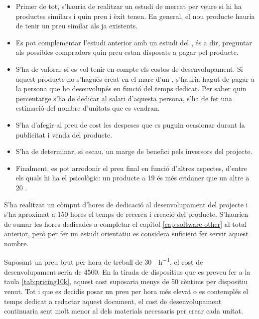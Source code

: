 \begin{itemize}
    \item Primer de tot, s'hauria de realitzar un estudi de mercat per veure
    si hi ha productes similars i quin preu i èxit tenen. En general, el nou
    producte hauria de tenir un preu similar als ja existents.
    \item Es pot complementar l'estudi anterior amb un estudi del ,
    és a dir, preguntar als possibles compradors quin preu estan disposats a
    pagar pel producte.
    \item S'ha de valorar si es vol tenir en compte els costos de
    desenvolupament. Si aquest producte no s'hagués creat en el marc d'un ,
    s'hauria hagut de pagar a la persona que ho desenvolupés en funció del
    temps dedicat. Per saber quin percentatge s'ha de dedicar al salari d'aquesta
    persona, s'ha de fer una estimació del nombre d'unitats que es vendran.
    \item S'ha d'afegir al preu de cost les despeses que es puguin ocasionar
    durant la publicitat i venda del producte.
    \item S'ha de determinar, si escau, un marge de benefici pels inversors
    del projecte.
    \item Finalment, es pot arrodonir el preu final en funció d'altres aspectes,
    d'entre els quals hi ha el psicològic: un producte a
    \SI[round-mode=places,round-precision=0]{19}{\EUR} és més cridaner que un
    altre a \SI[round-mode=places,round-precision=0]{20}{\EUR}
    \cite{kumar2017impact}.
\end{itemize}

S'ha realitzat un còmput d'hores de dedicació al desenvolupament del projecte i
s'ha aproximat a 150 hores el temps de recerca i creació del producte.
S'haurien de sumar les hores dedicades a completar el capítol
\ref{cap:software-other} al total anterior, però per fer un estudi orientatiu
es considera suficient fer servir aquest nombre.

Suposant un preu brut per hora de treball de
\SI[round-mode=places,round-precision=0]{30}{\EUR\per\hour}, el cost de
desenvolupament seria de \SI[round-mode=places,round-precision=0]{4500}{\EUR}.
En la tirada de dispositius que es preveu fer a la taula \ref{tab:pricing10k},
aquest cost suposaria menys de 50 cèntims per dispositiu venut. Tot i que es
decidís posar un preu per hora més elevat o es contemplés el temps dedicat a
redactar aquest document, el cost de desenvolupament continuaria sent molt menor
al dels materials necessaris per crear cada unitat.


